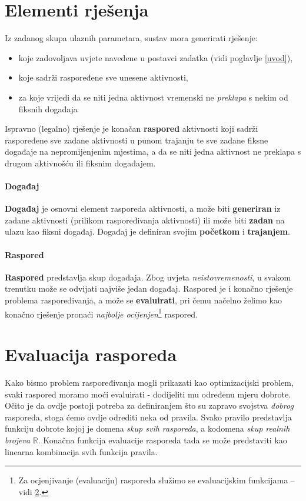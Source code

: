 \documentclass[times, utf8, zavrsni]{fer}
\begin{document}
\section{Elementi rješenja}\label{elementi rjesenja}
Iz zadanog skupa ulaznih parametara, sustav mora generirati rješenje:
\begin{itemize}
  \item koje zadovoljava uvjete navedene u postavci zadatka (vidi poglavlje \ref{uvod}),
  \item koje sadrži raspoređene sve unesene aktivnosti,
  \item za koje vrijedi da se niti jedna aktivnost vremenski ne \textit{preklapa} s nekim od fiksnih događaja
\end{itemize}

Ispravno (legalno) rješenje je konačan \textbf{raspored} aktivnosti koji sadrži raspoređene sve zadane aktivnosti u punom trajanju te sve zadane fiksne događaje na nepromijenjenim mjestima, a da se niti jedna aktivnost ne preklapa s drugom aktivnošću ili fiksnim događajem.

\paragraph{Događaj} \textbf{Događaj} je osnovni element rasporeda aktivnosti, a može biti \textbf{generiran} iz zadane aktivnosti (prilikom raspoređivanja aktivnosti) ili može biti \textbf{zadan} na ulazu kao fiksni događaj. Događaj je definiran svojim \textbf{početkom} i \textbf{trajanjem}.

\paragraph{Raspored} \textbf{Raspored} predstavlja skup događaja. Zbog uvjeta \textit{neistovremenosti}, u svakom trenutku može se odvijati najviše jedan događaj. Raspored je i konačno rješenje problema raspoređivanja, a može se \textbf{evaluirati}, pri čemu načelno želimo kao konačno rješenje pronaći \textit{najbolje ocijenjen}\footnote{Za ocjenjivanje (evaluaciju) rasporeda služimo se evaluacijskim funkcijama -- vidi \ref{evaluacija rasporeda}.} raspored.

\section{Evaluacija rasporeda}\label{evaluacija rasporeda}
Kako bismo problem raspoređivanja mogli prikazati kao optimizacijski problem, svaki raspored moramo moći evaluirati - dodijeliti mu određenu mjeru dobrote. Očito je da ovdje postoji potreba za definiranjem što su zapravo svojstva \textit{dobrog} rasporeda, stoga ćemo ovdje odrediti neka od pravila. Svako pravilo predstavlja funkciju dobrote kojoj je domena \textit{skup svih rasporeda}, a kodomena \textit{skup realnih brojeva} $\mathbb{R}$. Konačna funkcija evaluacije rasporeda tada se može predstaviti kao linearna kombinacija svih funkcija pravila.
\end{document}
